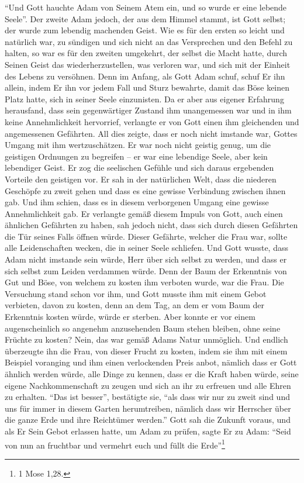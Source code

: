 "`Und Gott hauchte Adam von Seinem Atem ein, und so wurde er eine lebende Seele"'. Der zweite Adam jedoch, der aus dem Himmel stammt, ist Gott selbst; der wurde zum lebendig machenden Geist. Wie es für den ersten so leicht und natürlich war, zu sündigen und sich nicht an das Versprechen und den Befehl zu halten, so war es für den zweiten umgekehrt, der selbst die Macht hatte, durch Seinen Geist das wiederherzustellen, was verloren war, und sich mit der Einheit des Lebens zu versöhnen. Denn im Anfang, als Gott Adam schuf, schuf Er ihn allein, indem Er ihn vor jedem Fall und Sturz bewahrte, damit das Böse keinen Platz hatte, sich in seiner Seele einzunisten. Da er aber aus eigener Erfahrung herausfand, dass sein gegenwärtiger Zustand ihm unangemessen war und in ihm keine Annehmlichkeit hervorrief, verlangte er von Gott einen ihm gleichenden und angemessenen Gefährten. All dies zeigte, dass er noch nicht imstande war, Gottes Umgang mit ihm wertzuschätzen. Er war noch nicht geistig genug, um die geistigen Ordnungen zu begreifen -- er war eine lebendige Seele, aber kein lebendiger Geist. Er zog die seelischen Gefühle und sich daraus ergebenden Vorteile den geistigen vor. Er sah in der natürlichen Welt, dass die niederen Geschöpfe zu zweit gehen und dass es eine gewisse Verbindung zwischen ihnen gab. Und ihm schien, dass es in diesem verborgenen Umgang eine gewisse Annehmlichkeit gab. Er verlangte gemäß diesem Impuls von Gott, auch einen ähnlichen Gefährten zu haben, sah jedoch nicht, dass sich durch diesen Gefährten die Tür seines Falls öffnen würde. Dieser Gefährte, welcher die Frau war, sollte alle Leidenschaften wecken, die in seiner Seele schliefen. Und Gott wusste, dass Adam nicht imstande sein würde, Herr über sich selbst zu werden, und dass er sich selbst zum Leiden verdammen würde. Denn der Baum der Erkenntnis von Gut und Böse, von welchem zu kosten ihm verboten wurde, war die Frau. Die Versuchung stand schon vor ihm, und Gott musste ihm mit einem Gebot verbieten, davon zu kosten, denn an dem Tag, an dem er vom Baum der Erkenntnis kosten würde, würde er sterben. Aber konnte er vor einem augenscheinlich so angenehm anzusehenden Baum stehen bleiben, ohne seine Früchte zu kosten? Nein, das war gemäß Adams Natur unmöglich. Und endlich überzeugte ihn die Frau, von dieser Frucht zu kosten, indem sie ihm mit einem Beispiel voranging und ihm einen verlockenden Preis anbot, nämlich dass er Gott ähnlich werden würde, alle Dinge zu kennen, dass er die Kraft haben würde, seine eigene Nachkommenschaft zu zeugen und sich an ihr zu erfreuen und alle Ehren zu erhalten. "`Das ist besser"', bestätigte sie, "`als dass wir nur zu zweit sind und uns für immer in diesem Garten herumtreiben, nämlich dass wir Herrscher über die ganze Erde und ihre Reichtümer werden."' Gott sah die Zukunft voraus, und als Er Sein Gebot erlassen hatte, um Adam zu prüfen, sagte Er zu Adam: "`Seid von nun an fruchtbar und vermehrt euch und füllt die Erde"'\footnote{1 Mose 1,28.}


